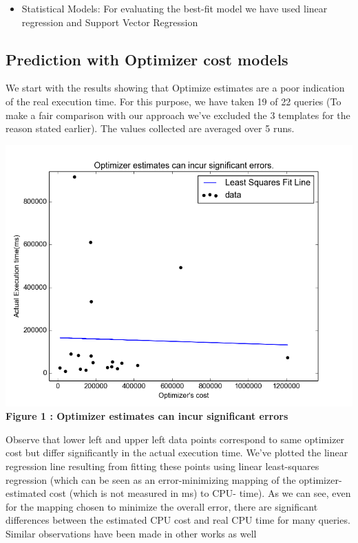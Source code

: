 \documentclass{article}
\begin{document}
\begin{multicols}{2}
\begin{itemize}
	\item Statistical Models: For evaluating the best-fit model we have used linear regression and Support Vector Regression \cite{sckit}
	
	
	\end{itemize}		
	
	\subsection{Prediction with Optimizer cost models}		
	We start with the results showing that Optimize estimates are a poor indication of the real
	execution time. For this purpose, we have taken 19 of 22 queries (To make a fair comparison with 
	our approach we've excluded the 3 templates for the reason stated earlier). The values collected are averaged over 5 runs.
	\begin{center}
	\includegraphics[scale=0.45]{optcost.png}
	\\
	\vspace{0.5cm}
	\textbf{Figure 1 : Optimizer estimates can incur significant errors}
	\end{center}
	\setcounter{figure}{1}
	
	Observe that lower left and upper left data points correspond to same
	optimizer cost but differ significantly in the actual execution time.
	We've plotted the linear regression line resulting from fitting these points 
	using linear least-squares regression 
	(which can be seen as an error-minimizing mapping of the
	optimizer-estimated cost (which is not measured in ms) to CPU-
	time). As we can see, even for the mapping chosen to minimize
	the overall error, there are significant differences between the estimated CPU cost 
	and real CPU time for many queries. Similar
	observations have been made in other works as well \cite{MSR,ICDE2012}


\end{multicols}
\end{document}
